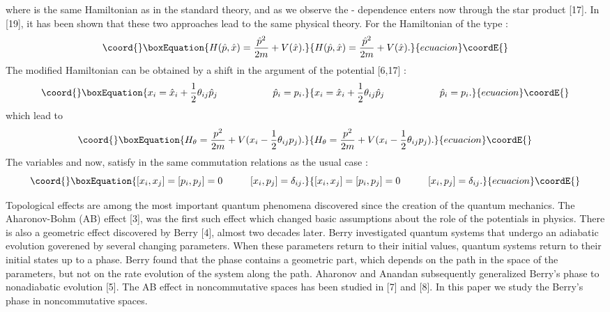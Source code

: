 \documentclass[a4paper,a4paper]{article}
\begin{document}
where \coordHE{} is the same Hamiltonian as in the standard theory,
and as we observe the \myHighlight{$\theta$}\coordHE{} - dependence enters now through the
star product [17]. In [19], it has been shown that these two
approaches lead to the same physical theory. For the Hamiltonian
of the type :
\begin{equation}\coord{}\boxEquation{
H(\hat{p},\hat{x})=\frac{\hat{p}^{2}}{2m}+V(\hat{x}) .
}{
H(\hat{p},\hat{x})=\frac{\hat{p}^{2}}{2m}+V(\hat{x}) .
}{ecuacion}\coordE{}\end{equation}
The modified Hamiltonian \coordHE{} can be obtained by a shift
in the argument of the potential [6,17] :
\begin{equation}\coord{}\boxEquation{
x_{i}=\hat{x}_{i}+\frac{1}{2}\theta_{ij}\hat{p}_{j}\hspace{2.cm}\hat{p}_{i}=p_{i}
.
}{
x_{i}=\hat{x}_{i}+\frac{1}{2}\theta_{ij}\hat{p}_{j}\hspace{2.cm}\hat{p}_{i}=p_{i}
.
}{ecuacion}\coordE{}\end{equation}
which lead to
\begin{equation}\coord{}\boxEquation{
H_{\theta}=\frac{p^{2}}{2m}+V(x_{i}-\frac{1}{2}\theta_{ij}p_{j}) .
}{
H_{\theta}=\frac{p^{2}}{2m}+V(x_{i}-\frac{1}{2}\theta_{ij}p_{j}) .
}{ecuacion}\coordE{}\end{equation}
The variables \coordHE{} and \coordHE{} now, satisfy in the same
commutation relations as the usual case :
\begin{equation}\coord{}\boxEquation{
[x_{i},x_{j}]=[p_{i},p_{j}]=0\hspace{1.cm}[x_{i},p_{j}]=\delta_{ij} .
}{
[x_{i},x_{j}]=[p_{i},p_{j}]=0\hspace{1.cm}[x_{i},p_{j}]=\delta_{ij} .
}{ecuacion}\coordE{}\end{equation}

Topological effects are among the most important quantum phenomena
discovered since the creation of the quantum mechanics. The
Aharonov-Bohm (AB) effect [3], was the first such effect which
changed basic assumptions about the role of the potentials in
physics. There is also a geometric effect discovered by Berry [4],
almost two decades later. Berry investigated quantum systems that
undergo an adiabatic evolution goverened by several changing
parameters. When these parameters return to their initial values,
quantum systems return to their initial states up to a phase.
Berry found that the phase contains a geometric part, which
depends on the path in the space of the parameters, but not on the
rate evolution of the system along the path. Aharonov and Anandan
subsequently generalized Berry's phase to nonadiabatic evolution
[5]. The AB effect in noncommutative spaces has been studied in
[7] and [8]. In this paper we study the Berry's phase in
noncommutative
spaces.\\
\end{document}
